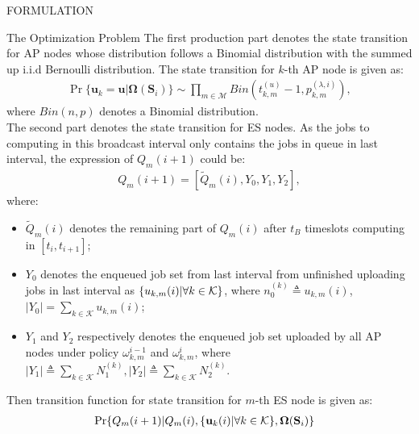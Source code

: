 \documentclass[10pt, conference, letterpaper]{IEEEtran}
\newcommand{\define}{\triangleq}
\renewcommand{\vec}{\mathbf}
\DeclarePairedDelimiter{\set}{\{}{\}}
\newcommand{\apSet}{\mathcal{K}}
\newcommand{\esSet}{\mathcal{M}}
\newcommand{\Stat}{\mathbf{S}}
\newcommand{\Policy}{\mathbf{\Omega}}
\begin{document}
\begin{section}{FORMULATION}
\begin{subsection}{The Optimization Problem}
            The first production part denotes the state transition for AP nodes whose distribution follows a Binomial distribution with the summed up i.i.d Bernoulli distribution. The state transition for $k$-th AP node is given as:
            \begin{align}
                \Pr\{\vec{u}_k=\vec{u}|\Policy(\Stat_i)\} \sim \prod_{m\in\esSet} Bin(t^{(u)}_{k,m}-1,p^{(\lambda, i)}_{k,m}),
            \end{align}
            where $Bin(n,p)$ denotes a Binomial distribution.
            \\
            The second part denotes the state transition for ES nodes. As the jobs to computing in this broadcast interval only contains the jobs in queue in last interval, the expression of $Q_m(i+1)$ could be:
            \begin{align}
                Q_m(i+1) = [\tilde{Q}_m(i), Y_0, Y_1, Y_2],
            \end{align}
            where:
            \begin{itemize}
                \item $\tilde{Q}_m(i)$ denotes the remaining part of $Q_m(i)$ after $t_B$ timeslots computing in $[t_{i}, t_{i+1}]$;
                \item $Y_0$ denotes the enqueued job set from last interval from unfinished uploading jobs in last interval as $\set{u_{k,m}(i)|\forall k\in\apSet}$, where $n^{(k)}_0 \define u_{k,m}(i)$, $|Y_0|=\sum_{k\in\apSet} u_{k,m}(i)$;
                \item $Y_1$ and $Y_2$ respectively denotes the enqueued job set uploaded by all AP nodes under policy $\omega_{k,m}^{i-1}$ and $\omega_{k,m}^{i}$, where $|Y_1|\define\sum_{k\in\apSet}N^{(k)}_1, |Y_2|\define\sum_{k\in\apSet}N^{(k)}_2$.
            \end{itemize}
            Then transition function for state transition for $m$-th ES node is given as:
            \begin{align}
                & \Pr\{Q_m(i+1)|Q_m(i), \set{\vec{u}_k(i)|\forall k\in\apSet}, \Policy(\Stat_i)\}

\end{align}
\end{subsection}
\end{section}
\end{document}
